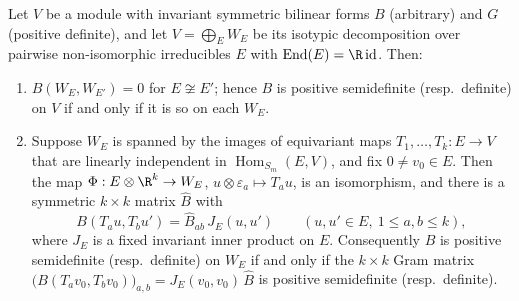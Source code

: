 \documentclass[../main.tex]{subfiles}
\begin{document}
\begin{lemma}
\label{lem:sol-frd2-reduction}
Let $V$ be a module with invariant symmetric bilinear forms $B$ (arbitrary) and $G$
(positive definite), and let $V=\bigoplus_EW_E$ be its isotypic decomposition over
pairwise non-isomorphic irreducibles $E$ with
$\operatorname{End}(E)=\R\,\mathrm{id}$.  Then:
\begin{enumerate}
\item $B(W_E,W_{E'})=0$ for $E\not\cong E'$; hence $B$ is positive semidefinite
  (resp.\ definite) on $V$ if and only if it is so on each $W_E$.
\item Suppose $W_E$ is spanned by the images of equivariant maps
  $T_1,\dots,T_k:E\to V$ that are linearly independent in
  $\operatorname{Hom}_{S_m}(E,V)$, and fix $0\ne v_0\in E$.  Then the map
  $\Phi:E\otimes\R^k\to W_E$, $u\otimes\varepsilon_a\mapsto T_au$, is an
  isomorphism, and there is a symmetric $k\times k$ matrix $\widehat B$ with
  \begin{equation}
    B(T_au,T_bu')=\widehat B_{ab}\,J_E(u,u')
    \qquad(u,u'\in E,\ 1\le a,b\le k),
    \label{eq:sol-frd2-tensor-form}
  \end{equation}
  where $J_E$ is a fixed invariant inner product on $E$.  Consequently $B$ is
  positive semidefinite (resp.\ definite) on $W_E$ if and only if the $k\times k$
  Gram matrix $\bigl(B(T_av_0,T_bv_0)\bigr)_{a,b}=J_E(v_0,v_0)\,\widehat B$ is
  positive semidefinite (resp.\ definite).
\end{enumerate}
\end{lemma}
\end{document}
